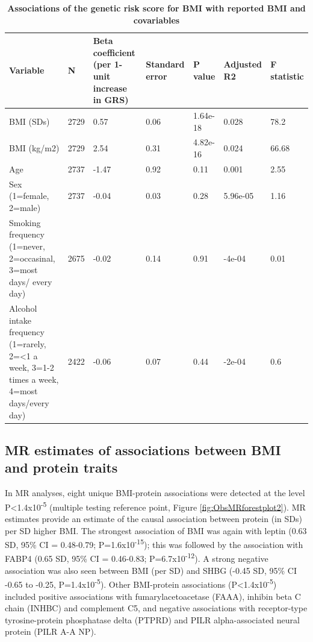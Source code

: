 \documentclass[11pt,twoside]{bristolthesis}
\begin{document}
\begin{landscape}\begin{table}

\caption[Associations of the genetic risk score for BMI with reported BMI and covariables]{\label{tab:INT-GRS-confounders}\textbf{Associations of the genetic risk score for BMI with reported BMI and covariables}}
\centering
\begin{tabu} to 
\toprule
Variable & N & Beta coefficient (per 1-unit increase in GRS) & Standard error & P value & Adjusted R2 & F statistic\\
\midrule
BMI (SDs) & 2729 & 0.57 & 0.06 & 1.64e-18 & 0.028 & 78.2\\
BMI (kg/m2) & 2729 & 2.54 & 0.31 & 4.82e-16 & 0.024 & 66.68\\
Age & 2737 & -1.47 & 0.92 & 0.11 & 0.001 & 2.55\\
Sex (1=female, 2=male) & 2737 & -0.04 & 0.03 & 0.28 & 5.96e-05 & 1.16\\
Smoking frequency (1=never, 2=occasinal, 3=most days/ every day) & 2675 & -0.02 & 0.14 & 0.91 & -4e-04 & 0.01\\
\addlinespace
Alcohol intake frequency (1=rarely, 2=<1 a week, 3=1-2 times a week, 4=most days/every day) & 2422 & -0.06 & 0.07 & 0.44 & -2e-04 & 0.6\\
\bottomrule
\end{tabu}
\end{table}
\end{landscape}
\hypertarget{mr-estimates-of-associations-between-bmi-and-protein-traits}{%
\subsection{MR estimates of associations between BMI and protein traits}\label{mr-estimates-of-associations-between-bmi-and-protein-traits}}

In MR analyses, eight unique BMI-protein associations were detected at the level P\textless1.4x10\textsuperscript{-5} (multiple testing reference point, Figure \ref{fig:ObsMRforestplot2}). MR estimates provide an estimate of the causal association between protein (in SDs) per SD higher BMI. The strongest association of BMI was again with leptin (0.63 SD, 95\% CI = 0.48-0.79; P=1.6x10\textsuperscript{-15}); this was followed by the association with FABP4 (0.65 SD, 95\% CI = 0.46-0.83; P=6.7x10\textsuperscript{-12}). A strong negative association was also seen between BMI (per SD) and SHBG (-0.45 SD, 95\% CI -0.65 to -0.25, P=1.4x10\textsuperscript{-5}). Other BMI-protein associations (P\textless1.4x10\textsuperscript{-5}) included positive associations with fumarylacetoacetase (FAAA), inhibin beta C chain (INHBC) and complement C5, and negative associations with receptor-type tyrosine-protein phosphatase delta (PTPRD) and PILR alpha-associated neural protein (PILR A-A NP).
\end{document}

